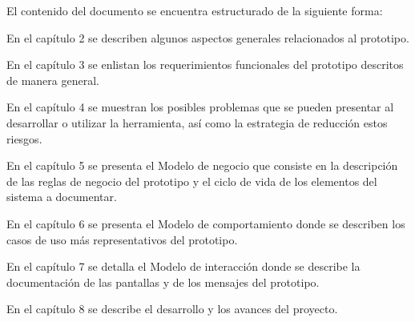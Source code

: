 El contenido del documento se encuentra estructurado de la siguiente forma:

\begin{Citemize}
	\item En el capítulo 2  se describen algunos aspectos generales relacionados al prototipo.
	\item En el capítulo 3  se enlistan los requerimientos funcionales del prototipo descritos de manera general.
	\item En el capítulo 4  se muestran los posibles problemas que se pueden presentar al desarrollar o utilizar la herramienta, así como la estrategia de reducción estos riesgos.
	\item En el capítulo 5  se presenta el Modelo de negocio que consiste en la descripción de las reglas de negocio del prototipo y el ciclo de vida de los elementos del sistema a documentar.
	\item En el capítulo 6  se presenta el Modelo de comportamiento donde se describen los casos de uso más representativos del prototipo.
	\item En el capítulo 7  se detalla el Modelo de interacción donde se describe la documentación de las pantallas y de los mensajes del prototipo.
	\item En el capítulo 8  se describe el desarrollo y los avances del proyecto.
\end{Citemize}


